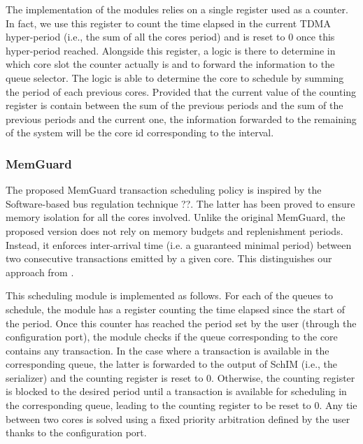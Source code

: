            The implementation of the modules relies on a single register used as a counter. In fact, we use this register to count the time elapsed in the current TDMA hyper-period (i.e., the sum of all the cores period) and is reset to 0 once this hyper-period reached. Alongside this register, a logic is there to determine in which core slot the counter actually is and to forward the information to the queue selector. The logic is able to determine the core to schedule by summing the period of each previous cores. Provided that the current value of the counting register is contain between the sum of the previous periods and the sum of the previous periods and the current one, the information forwarded to the remaining of the system will be the core id corresponding to the interval.
        
        \subsubsection{MemGuard}
            The proposed MemGuard transaction scheduling policy is inspired by the Software-based bus regulation technique ??. The latter has been proved to ensure memory isolation for all the cores involved. Unlike the original MemGuard, the proposed version does not rely on memory budgets and replenishment periods. Instead, it enforces inter-arrival time (i.e. a guaranteed minimal period) between two consecutive transactions emitted by a given core. This distinguishes our approach from \cite{Farshchi2020BRUBR}.
                    
            This scheduling module is implemented as follows. For each of the queues to schedule, the module has a register counting the time elapsed since the start of the period. Once this counter has reached the period set by the user (through the configuration port), the module checks if the queue corresponding to the core contains any transaction. In the case where a transaction is available in the corresponding queue, the latter is forwarded to the output of SchIM (i.e., the serializer) and the counting register is reset to 0. Otherwise, the counting register is blocked to the desired period until a transaction is available for scheduling in the corresponding queue, leading to the counting register to be reset to 0. Any tie between two cores is solved using a fixed priority arbitration defined by the user thanks to the configuration port. 

